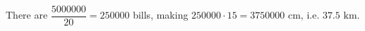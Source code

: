 There are $\dfrac{5000000}{20}=250000$ bills, making $250000\cdot15=3750000$ cm, i.e. $\boxed{37.5\text{ km}}$.
